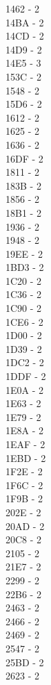 \documentclass[10pt,letterpaper]{article}
\begin{document}
1462 -  2\\
14BA -  2\\
14CD -  2\\
14D9 -  2\\
14E5 -  3\\
153C -  2\\
1548 -  2\\
15D6 -  2\\
1612 -  2\\
1625 -  2\\
1636 -  2\\
16DF -  2\\
1811 -  2\\
183B -  2\\
1856 -  2\\
18B1 -  2\\
1936 -  2\\
1948 -  2\\
19EE -  2\\
1BD3 -  2\\
1C20 -  2\\
1C36 -  2\\
1C90 -  2\\
1CE6 -  2\\
1D00 -  2\\
1D39 -  2\\
1DC2 -  2\\
1DDF -  2\\
1E0A -  2\\
1E63 -  2\\
1E79 -  2\\
1E8A -  2\\
1EAF -  2\\
1EBD -  2\\
1F2E -  2\\
1F6C -  2\\
1F9B -  2\\
202E -  2\\
20AD -  2\\
20C8 -  2\\
2105 -  2\\
21E7 -  2\\
2299 -  2\\
22B6 -  2\\
2463 -  2\\
2466 -  2\\
2469 -  2\\
2547 -  2\\
25BD -  2\\
2623 -  2\\
\end{document}
